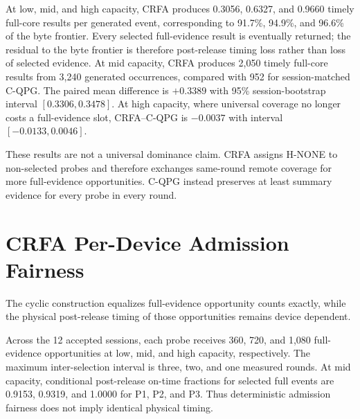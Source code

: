 \documentclass[10pt,onecolumn]{IEEEtran}
\begin{document}
\begin{table}[h]
\centering
\caption{CRFA physical attainment of the unrestricted full-evidence byte frontier. The C-QPG column uses the session-matched primary hardware result; paired intervals are descriptive 95\% session-bootstrap intervals.}
\label{tab:supp_crfa_hardware}

\end{table}

At low, mid, and high capacity, CRFA produces 0.3056, 0.6327, and 0.9660
timely full-core results per generated event, corresponding to 91.7\%, 94.9\%,
and 96.6\% of the byte frontier. Every selected full-evidence result is
eventually returned; the residual to the byte frontier is therefore
post-release timing loss rather than loss of selected evidence. At mid
capacity, CRFA produces 2,050 timely full-core results from 3,240 generated
occurrences, compared with 952 for session-matched C-QPG. The paired mean
difference is $+0.3389$ with 95\% session-bootstrap interval
$[0.3306,0.3478]$. At high capacity, where universal coverage no longer costs
a full-evidence slot, CRFA--C-QPG is $-0.0037$ with interval
$[-0.0133,0.0046]$.

These results are not a universal dominance claim. CRFA assigns H-NONE to
non-selected probes and therefore exchanges same-round remote coverage for
more full-evidence opportunities. C-QPG instead preserves at least summary
evidence for every probe in every round.

\section{CRFA Per-Device Admission Fairness}
The cyclic construction equalizes full-evidence opportunity counts exactly,
while the physical post-release timing of those opportunities remains device
dependent.
\begin{table}[h]
\centering
\caption{CRFA per-device admission opportunity and post-release timing.}
\label{tab:supp_crfa_fairness}

\end{table}
Across the 12 accepted sessions, each probe receives 360, 720, and 1,080
full-evidence opportunities at low, mid, and high capacity, respectively. The
maximum inter-selection interval is three, two, and one measured rounds. At
mid capacity, conditional post-release on-time fractions for selected full
events are 0.9153, 0.9319, and 1.0000 for P1, P2, and P3. Thus deterministic
admission fairness does not imply identical physical timing.
\end{document}
